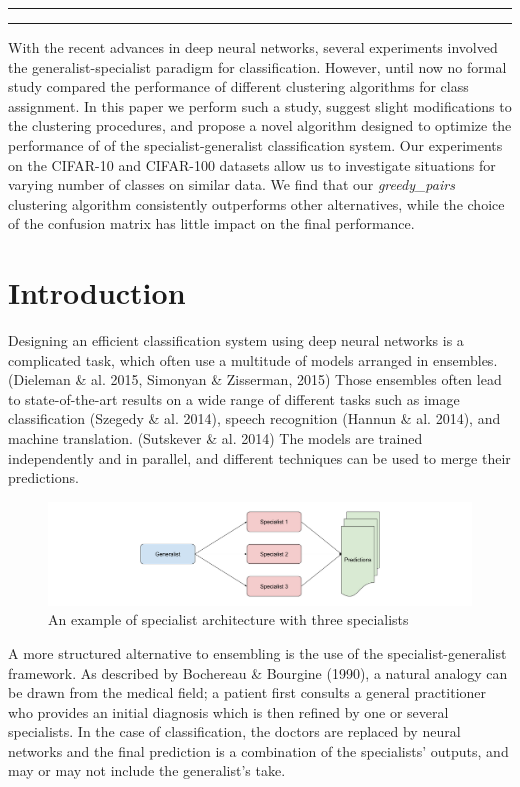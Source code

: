 \documentclass[12pt]{article}
\makeatletter
\def\maketitle{
    \begin{centering}
    \par\rule{\textwidth}{2pt}
    \par\hfill
    \par\textbf{\LARGE\@title}
    \par\hfill
    \par{\textit{\@author}}
    \par\hfill
    \par{\@date}
    \par\rule{\textwidth}{2pt}
    \end{centering}
}
\makeatother
\begin{document}
\thispagestyle{empty}
\maketitle
\hfill
\abstract
With the recent advances in deep neural networks, several experiments
involved the generalist-specialist paradigm for classification. However,
until now no formal study compared the performance of different
clustering algorithms for class assignment. In this paper we perform
such a study, suggest slight modifications to the clustering procedures,
and propose a novel algorithm designed to optimize the performance of of
the specialist-generalist classification system. Our experiments on the
CIFAR-10 and CIFAR-100 datasets allow us to investigate situations for
varying number of classes on similar data. We find that our
\emph{greedy\_pairs} clustering algorithm consistently outperforms other
alternatives, while the choice of the confusion matrix has little impact
on the final performance.

\section{Introduction}\label{introduction}

Designing an efficient classification system using deep neural networks
is a complicated task, which often use a multitude of models arranged in
ensembles. (Dieleman \& al. 2015, Simonyan \& Zisserman, 2015) Those
ensembles often lead to state-of-the-art results on a wide range of
different tasks such as image classification (Szegedy \& al. 2014),
speech recognition (Hannun \& al. 2014), and machine translation.
(Sutskever \& al. 2014) The models are trained independently and in
parallel, and different techniques can be used to merge their
predictions.

\begin{figure}[htbp]
\centering
\includegraphics{./figs/specialists.png}
\caption{An example of specialist architecture with three specialists}
\end{figure}

A more structured alternative to ensembling is the use of the
specialist-generalist framework. As described by Bochereau \& Bourgine
(1990), a natural analogy can be drawn from the medical field; a patient
first consults a general practitioner who provides an initial diagnosis
which is then refined by one or several specialists. In the case of
classification, the doctors are replaced by neural networks and the
final prediction is a combination of the specialists' outputs, and may
or may not include the generalist's take.
\end{document}
